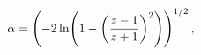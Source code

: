 \[\alpha=\left(-2\mathop{\ln\/}\nolimits\!\left(1-\left(\frac{z-1}{z+1}\right)^{%
2}\right)\right)^{1/2},\]